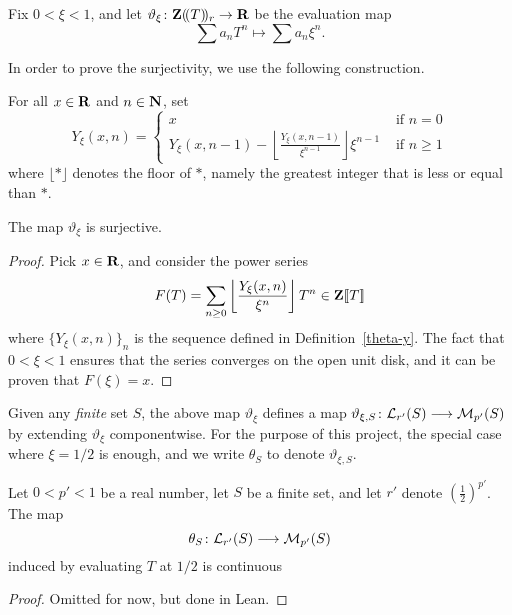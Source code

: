 \begin{definition}
  \label{theta}
  \leanok
  Fix $0<\xi <1$, and let $\vartheta_{\xi}\colon \mathbf{Z}(\!(T)\!)_r\rightarrow \mathbf{R}$ be the evaluation map
  \[
    \sum a_nT^n\longmapsto \sum a_n\xi^n.
  \]
\end{definition}

In order to prove the surjectivity, we use the following construction.
\begin{definition}
  \label{theta-y}
  \leanok
  For all $x \in \mathbf{R}$ and $n\in\mathbf{N}$, set
  \[
    Y_\xi(x, n)=
    \begin{cases}
      x&\text{ if } n = 0 \\
      Y_\xi(x,n-1) - \left\lfloor \frac{Y_\xi(x,n-1)}{\xi^{n-1}} \right\rfloor \xi^{n-1} & \text{ if } n \ge 1
    \end{cases}
  \]
where $\lfloor \ast \rfloor$ denotes the floor of $\ast$, namely the greatest integer that is less or equal than $\ast$.
\end{definition}

\begin{lemma}
  \label{theta-surjective}
  \leanok
  The map $\vartheta_{\xi}$ is surjective.
\end{lemma}

\begin{proof}
  \leanok
  Pick $x\in \mathbf{R}$, and consider the power series
  \[
    F(T)=\sum_{n\geq 0}\left\lfloor \frac{Y_\xi(x,n)}{\xi^n}\right\rfloor T^n\in\mathbf{Z}[\![T]\!]
  \]
  where $\{Y_\xi(x,n)\}_{n}$ is the sequence defined in Definition~\ref{theta-y}. The fact that $0<\xi<1$ ensures that the series converges on the open unit disk, and it can be proven that $F(\xi)=x$.
\end{proof}

Given any \emph{finite} set $S$, the above map $\vartheta_{\xi}$ defines a map $\vartheta_{\xi,S}\colon \mathcal L_{r'}(S)\longrightarrow \mathcal M_{p'}(S)$ by extending $\vartheta_{\xi}$ componentwise.
For the purpose of this project, the special case where $\xi=1/2$ is enough, and we write $\theta_S$ to denote $\vartheta_{\xi,S}$. 

\begin{lemma}
  \label{theta-continuous}
  \leanok
Let $0<p'<1$ be a real number, let $S$ be a finite set, and let $r'$ denote $\left(\frac{1}{2}\right)^{p'}$. The map
\[
\theta_{S}\colon \mathcal L_{r'}(S)\longrightarrow \mathcal M_{p'}(S)
\]
induced by evaluating $T$ at $1/2$ is continuous
\end{lemma}

\begin{proof}
  \leanok
  Omitted for now, but done in Lean.
\end{proof}

